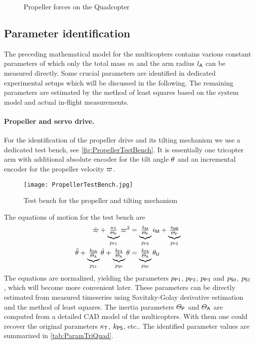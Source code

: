 \begin{figure}[ht]
 \centering
 
 \caption{Propeller forces on the Quadcopter}
 \label{fig:QuadcopterInputs}
\end{figure}


\subsection{Parameter identification}
The preceding mathematical model for the multicopters contains various constant parameters of which only the total mass $\m$ and the arm radius $\ArmRadius$ can be measured directly.
Some crucial parameters are identified in dedicated experimental setups which will be discussed in the following.
The remaining parameters are estimated by the method of least squares based on the system model and actual in-flight measurements.


\paragraph{Propeller and servo drive.}
For the identification of the propeller drive and its tilting mechanism we use a dedicated test bench, see \autoref{fig:PropellerTestBench}.
It is essentially one tricopter arm with additional absolute encoder for the tilt angle $\PropTilt$ and an incremental encoder for the propeller velocity $\PropVel$.

\begin{figure}
 \centering
 \texttt{[image: PropellerTestBench.jpg]}
 \caption{Test bench for the propeller and tilting mechanism}
 \label{fig:PropellerTestBench}
\end{figure}
 
The equations of motion for the test bench are
\begin{align}
 \PropVeld + \underbrace{\tfrac{\kappaT}{\JP}}_{\PropParam[1]} \PropVel^2 &= \underbrace{\tfrac{\BLDCTorqueConstant}{\JP}}_{\PropParam[2]} \BLDCCurr + \underbrace{\tfrac{\BLDCFriction}{\JP}}_{\PropParam[3]}
\\
 \aServodd + \underbrace{\tfrac{\ServoKD}{\JA}}_{\ServoParam[1]} \aServod + \underbrace{\tfrac{\ServoKP}{\JA}}_{\ServoParam[0]} \aServo &= \underbrace{\tfrac{\ServoKP}{\JA}}_{\ServoParam[0]} \aServoU
\end{align}
The equations are normalized, yielding the parameters $\PropParam[1]$, $\PropParam[2]$, $\PropParam[3]$ and $\ServoParam[0]$, $\ServoParam[1]$, which will become more convenient later.
These parameters can be directly estimated from measured timeseries using Savitzky-Golay derivative estimation and the method of least squares.
The inertia parameters $\JP$ and $\JA$ are computed from a detailed CAD model of the multicopters.
With them one could recover the original parameters $\kappaT$, $\ServoKP$, etc.. 
The identified parameter values are summarized in \autoref{tab:ParamTriQuad}.

